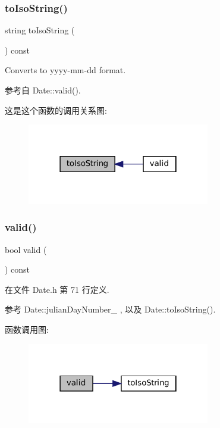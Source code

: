 \subsubsection{\texorpdfstring{to\+Iso\+String()}{toIsoString()}}
{\footnotesize\ttfamily string to\+Iso\+String (\begin{DoxyParamCaption}{ }\end{DoxyParamCaption}) const}

Converts to yyyy-\/mm-\/dd format. 

参考自 Date\+::valid().

这是这个函数的调用关系图\+:
\nopagebreak
\begin{figure}[H]
\begin{center}
\leavevmode
\includegraphics[width=226pt]{classmuduo_1_1Date_aa9bd4dc5b8cade6a8e0c8e1a613b6d39_icgraph}
\end{center}
\end{figure}
\mbox{\label{classmuduo_1_1Date_a315419f26d3c59fa143b49b90a019049}} 
\subsubsection{\texorpdfstring{valid()}{valid()}}
{\footnotesize\ttfamily bool valid (\begin{DoxyParamCaption}{ }\end{DoxyParamCaption}) const\hspace{0.3cm}{\ttfamily [inline]}}



在文件 Date.\+h 第 71 行定义.



参考 Date\+::julian\+Day\+Number\+\_\+ , 以及 Date\+::to\+Iso\+String().

函数调用图\+:
\nopagebreak
\begin{figure}[H]
\begin{center}
\leavevmode
\includegraphics[width=226pt]{classmuduo_1_1Date_a315419f26d3c59fa143b49b90a019049_cgraph}
\end{center}
\end{figure}
\mbox{\label{classmuduo_1_1Date_a7b32d82997343aa47bf42a65566d2cd3}} 
